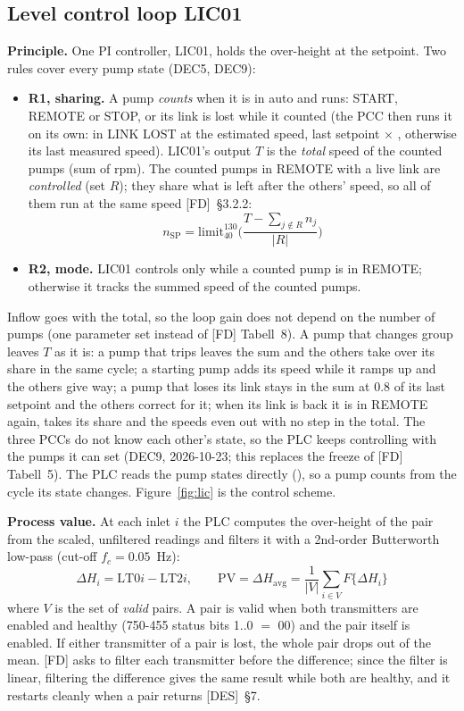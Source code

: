 \documentclass[11pt,a4paper]{article}
\begin{document}
\subsection{Level control loop LIC01}
\label{sec:lic}
\textbf{Principle.} One PI controller, LIC01, holds the over-height at the setpoint. Two rules cover
every pump state (DEC5, DEC9):
\begin{itemize}
  \item \textbf{R1, sharing.} A pump \emph{counts} when it is in auto and runs: START, REMOTE or STOP,
        or its link is lost while it counted (the PCC then runs it on its own: in LINK LOST at the estimated
        speed, last setpoint $\times$ , otherwise its last measured speed). LIC01's output $T$ is the \emph{total} speed of the counted pumps (sum of rpm). The counted
        pumps in REMOTE with a live link are \emph{controlled} (set $R$); they share what is left after the
        others' speed, so all of them run at the same speed [FD]~\S3.2.2:
\[
n_\text{SP} = \mathrm{limit}_{40}^{130}\Big(\frac{T - \sum_{j\notin R} n_j}{|R|}\Big)
\]
  \item \textbf{R2, mode.} LIC01 controls only while a counted pump is in REMOTE; otherwise it tracks the
        summed speed of the counted pumps.
\end{itemize}
Inflow goes with the total, so the loop gain does not depend on the number of pumps (one parameter set
instead of [FD] Tabell~8). A pump that changes group leaves $T$ as it is: a pump that trips leaves the sum
and the others take over its share in the same cycle; a starting pump adds its speed while it ramps up and
the others give way; a pump that loses its link stays in the sum at 0.8 of its last setpoint and the
others correct for it; when its link is back it is in REMOTE again, takes its share and the speeds even out
with no step in the total.
The three PCCs do not know each other's state, so the PLC keeps controlling with the pumps it can set
(DEC9, 2026-10-23; this replaces the freeze of [FD] Tabell~5). The PLC reads the pump states directly
(), so a pump counts from the cycle its state changes. Figure~\ref{fig:lic} is the
control scheme.

\textbf{Process value.} At each inlet $i$ the PLC computes the over-height of the pair from the
scaled, unfiltered readings and filters it with a 2nd-order Butterworth low-pass (cut-off
$f_c = 0.05$~Hz):
\[
\Delta H_i = \mathrm{LT0}i - \mathrm{LT2}i, \qquad
\mathrm{PV} = \Delta H_\text{avg} = \frac{1}{|V|}\sum_{i\in V} F\{\Delta H_i\}
\]
where $V$ is the set of \emph{valid} pairs. A pair is valid when both transmitters are enabled and
healthy (750-455 status bits 1..0 $=$ 00) and the pair itself is enabled. If either transmitter of a
pair is lost, the whole pair drops out of the mean. [FD] asks to filter each transmitter
before the difference; since the filter is linear, filtering the difference gives the same result
while both are healthy, and it restarts cleanly when a pair returns [DES]~\S7.
\end{document}
